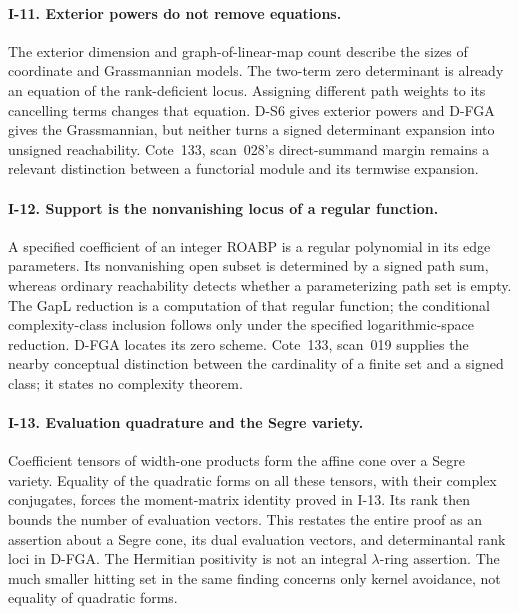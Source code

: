 \paragraph{I-11. Exterior powers do not remove equations.}
The exterior dimension and graph-of-linear-map count describe the sizes of coordinate and Grassmannian models. The two-term zero determinant is already an equation of the rank-deficient locus. Assigning different path weights to its cancelling terms changes that equation. D-S6 gives exterior powers and D-FGA gives the Grassmannian, but neither turns a signed determinant expansion into unsigned reachability. Cote~133, scan~028's direct-summand margin remains a relevant distinction between a functorial module and its termwise expansion.

\paragraph{I-12. Support is the nonvanishing locus of a regular function.}
A specified coefficient of an integer ROABP is a regular polynomial in its edge parameters. Its nonvanishing open subset is determined by a signed path sum, whereas ordinary reachability detects whether a parameterizing path set is empty. The GapL reduction is a computation of that regular function; the conditional complexity-class inclusion follows only under the specified logarithmic-space reduction. D-FGA locates its zero scheme. Cote~133, scan~019 supplies the nearby conceptual distinction between the cardinality of a finite set and a signed class; it states no complexity theorem.

\paragraph{I-13. Evaluation quadrature and the Segre variety.}
Coefficient tensors of width-one products form the affine cone over a Segre variety. Equality of the quadratic forms on all these tensors, with their complex conjugates, forces the moment-matrix identity proved in I-13. Its rank then bounds the number of evaluation vectors. This restates the entire proof as an assertion about a Segre cone, its dual evaluation vectors, and determinantal rank loci in D-FGA. The Hermitian positivity is not an integral $\lambda$-ring assertion. The much smaller hitting set in the same finding concerns only kernel avoidance, not equality of quadratic forms.


